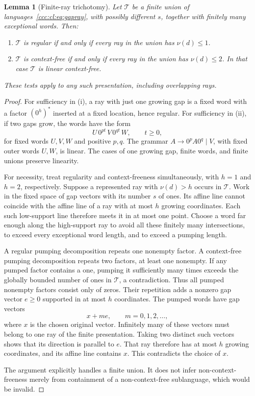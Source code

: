 \documentclass[11pt,letterpaper]{article}
\newtheorem{lemma}[theorem]{Lemma}
\theoremstyle{definition}
\theoremstyle{remark}
\begin{document}
\begin{lemma}[Finite-ray trichotomy]\label{ccc:cl:lem:gapray}
Let $\mathcal T$ be a finite union of languages~\eqref{ccc:cl:eq:gapray}, with possibly
different $s$, together with finitely many exceptional words. Then:
\begin{enumerate}[label=(\roman*)]
\item $\mathcal T$ is regular if and only if every ray in the union has
$\nu(d)\le1$.
\item $\mathcal T$ is context-free if and only if every ray in the union has
$\nu(d)\le2$. In that case $\mathcal T$ is linear context-free.
\end{enumerate}
These tests apply to any such presentation, including overlapping rays.
\end{lemma}
\begin{proof}
For sufficiency in (i), a ray with just one growing gap is a fixed word
with a factor $(0^h)^*$ inserted at a fixed location, hence regular.
For sufficiency in (ii), if two gaps grow, the words have the form
\[
 U\,0^{pt}\,V\,0^{qt}\,W,\qquad t\ge0,
\]
for fixed words $U,V,W$ and positive $p,q$. The grammar
$A\to0^p A0^q\mid V$, with fixed outer words $U,W$, is linear.
The cases of one growing gap, finite words, and finite unions preserve
linearity.

For necessity, treat regularity and context-freeness simultaneously,
with $h=1$ and $h=2$, respectively. Suppose a represented ray with
$\nu(d)>h$ occurs in $\mathcal T$. Work in the fixed space of gap vectors with its
number $s$ of ones. Its affine line cannot coincide with the affine line
of a ray with at most $h$ growing coordinates. Each such low-support line
therefore meets it in at most one point. Choose a word far enough along
the high-support ray to avoid all these finitely many intersections, to
exceed every exceptional word length, and to exceed a pumping length.

A regular pumping decomposition repeats one nonempty factor. A
context-free pumping decomposition repeats two factors, at least one
nonempty. If any pumped factor contains a one, pumping it sufficiently
many times exceeds the globally bounded number of ones in $\mathcal T$, a
contradiction. Thus all pumped nonempty factors consist only of zeros.
Their repetition adds a nonzero gap vector $e\ge0$ supported in at most
$h$ coordinates. The pumped words have gap vectors
\[
 x+me,\qquad m=0,1,2,\ldots,
\]
where $x$ is the chosen original vector. Infinitely many of these vectors
must belong to one ray of the finite presentation. Taking two distinct
such vectors shows that its direction is parallel to $e$. That ray
therefore has at most $h$ growing coordinates, and its affine line
contains $x$. This contradicts the choice of $x$.

The argument explicitly handles a finite union. It does not infer
non-context-freeness merely from containment of a non-context-free
sublanguage, which would be invalid.
\end{proof}
\end{document}
